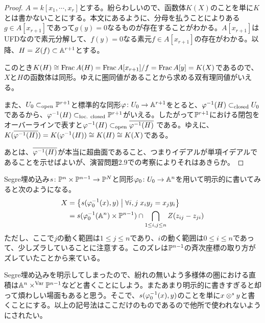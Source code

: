 \begin{proof}
  $A = k[x_1, \cdots , x_r]$とする。紛らわしいので、函数体$K(X)$のことを単に$K$とは書かないことにする。本文にあるように、分母を払うことによりある$g \in A[x_{r+1}]$であって$g(y)=0$なるものが存在することがわかる。$A[x_{r+1}]$はUFDなので素元分解して、$f(y)=0$なる素元$f \in A[x_{r+1}]$の存在がわかる。以降、$H = Z(f) \subset \A^{r+1}$とする。

  このとき$K(H) \cong \Frac A(H) = \Frac A[x_{r+1}]/f = \Frac A[y] = K(X)$であるので、$X$と$H$の函数体は同形。ゆえに圏同値があることから求める双有理同値がいえる。

  また、$U_0 \opsub \P^{r+1}$と標準的な同形$\vp \colon U_0 \to \A^{r+1}$をとると、$\vp^{-1}(H) \clsub U_0$であるから、$\vp^{-1}(H) \loc \P^{r+1}$がいえる。したがって$\P^{r+1}$における閉包をオーバーラインで表すと$\vp^{-1}(H) \opsub \ol{\vp^{-1}(H)}$
  である。ゆえに、$K(\ol{\vp^{-1}(H)}) = K(\vp^{-1}(H)) \cong K(H) \cong K(X)$である。

  あとは、$\ol{\vp^{-1}(H)}$が本当に超曲面であること、つまりイデアルが単項イデアルであることを示せばよいが、演習問題2.9での考察によりそれはあきらか。
\end{proof}






\begin{rem}
  Segre埋め込み$s \colon \P^n \tm \P^{n-1} \to \P^N$と同形$\vp_0 \colon U_0 \to \A^n$を用いて明示的に書いてみると次のようになる。
\begin{align*}
  X &= \setmid{s(\vp_0^{-1}(x), y )}{\forall i,j \;  x_iy_j = x_j y_i} \\
  &= s(\vp_0^{-1}(\A^n) \tm \P^{n-1}) \cap \bigcap_{1 \leq i,j \leq n} Z(z_{ij} - z_{ji})
\end{align*}
ただし、ここで$j$の動く範囲は$1 \leq j \leq n$であり、$i$の動く範囲は$0 \leq i \leq n$であって、少しズラしていることに注意する。このズレは$\P^{n-1}$の斉次座標の取り方がズレていたことから来ている。

Segre埋め込みを明示してしまったので、紛れの無いよう多様体の圏における直積は$\A^n \vartm \P^{n-1}$などと書くことにしよう。またあまり明示的に書きすぎると却って煩わしい場面もあると思う。そこで、$s(\vp_0^{-1}(x), y)$のことを単に$x \ts^{s} y$と書くことにする。以上の記号法はここだけのものであるので他所で使われないようにされたい。
\end{rem}




